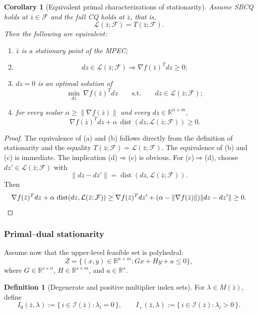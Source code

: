\documentclass[pdflatex,sn-mathphys-num]{sn-jnl}%
\newtheorem{corollary}[theorem]{Corollary}
\theoremstyle{definition}
\newtheorem{definition}[theorem]{Definition}
\newcommand{\R}{\mathbb{R}}
\newcommand{\Fcal}{\mathcal{F}}
\newcommand{\Lcal}{\mathcal{L}}
\newcommand{\Ical}{\mathcal{I}}
\newcommand{\dist}{\operatorname{dist}}
\begin{document}
\begin{corollary}[Equivalent primal characterizations of stationarity]
\label{cor:331}
Assume SBCQ holds at $\bar z\in\Fcal$ and the full CQ holds at $\bar z$,
that is,
\[
\Lcal(\bar z;\Fcal)=T(\bar z;\Fcal).
\]
Then the following are equivalent:
\begin{enumerate}[label=\textnormal{(\alph*)}]
\item $\bar z$ is a stationary point of the MPEC;
\item
\[
dz\in \Lcal(\bar z;\Fcal)\Longrightarrow \nabla f(\bar z)^Tdz\ge 0;
\]
\item $dz=0$ is an optimal solution of
\[
\min_{dz}\ \nabla f(\bar z)^Tdz
\qquad\text{s.t.}\qquad dz\in \Lcal(\bar z;\Fcal);
\]
\item for every scalar $\alpha\ge \|\nabla f(\bar z)\|$ and every
$dz\in\R^{n+m}$,
\[
\nabla f(\bar z)^Tdz+\alpha\,\dist(dz,\Lcal(\bar z;\Fcal))\ge 0.
\]
\end{enumerate}
\end{corollary}

\begin{proof}
The equivalence of (a) and (b) follows directly from the definition of
stationarity and the equality $T(\bar z;\Fcal)=\Lcal(\bar z;\Fcal)$. The
equivalence of (b) and (c) is immediate. The implication (d)$\Rightarrow$(c)
is obvious. For (c)$\Rightarrow$(d), choose $dz'\in\Lcal(\bar z;\Fcal)$ with
\[
\|dz-dz'\|=\dist(dz,\Lcal(\bar z;\Fcal)).
\]
Then
\[
\nabla f(\bar z)^Tdz+\alpha\,\dist(dz,\Lcal(\bar z;\Fcal))
\ge
\nabla f(\bar z)^Tdz'+(\alpha-\|\nabla f(\bar z)\|)\|dz-dz'\|\ge 0.
\qedhere
\]
\end{proof}

\subsubsection{Primal--dual stationarity}

Assume now that the upper-level feasible set is polyhedral:
\[
Z=\{(x,y)\in\R^{n+m}: Gx+Hy+a\le 0\},
\]
where $G\in\R^{s\times n}$, $H\in\R^{s\times m}$, and $a\in\R^s$.

\begin{definition}[Degenerate and positive multiplier index sets]
For $\lambda\in M(\bar z)$, define
\[
I_0(\bar z,\lambda):=\{\,i\in\Ical(\bar z):\lambda_i=0\,\},
\qquad
I_+(\bar z,\lambda):=\{\,i\in\Ical(\bar z):\lambda_i>0\,\}.
\]
\end{definition}
\end{document}
